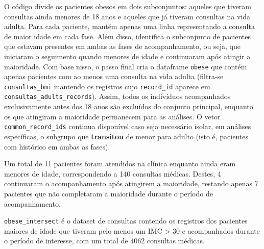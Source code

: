 \documentclass[
]{article}
\newenvironment{Shaded}{\begin{snugshade}}{\end{snugshade}}
\newcommand{\CommentTok}[1]{\textcolor[rgb]{0.37,0.37,0.37}{#1}}
\newcommand{\FunctionTok}[1]{\textcolor[rgb]{0.28,0.35,0.67}{#1}}
\newcommand{\NormalTok}[1]{\textcolor[rgb]{0.00,0.23,0.31}{#1}}
\newcommand{\OtherTok}[1]{\textcolor[rgb]{0.00,0.23,0.31}{#1}}
\newcommand{\SpecialCharTok}[1]{\textcolor[rgb]{0.37,0.37,0.37}{#1}}
\begin{document}
\begin{Shaded}
\end{Shaded}

O código divide os pacientes obesos em dois subconjuntos: aqueles que
tiveram consultas ainda menores de 18 anos e aqueles que já tiveram
consultas na vida adulta. Para cada paciente, mantém apenas uma linha
representando a consulta de maior idade em cada fase. Além disso,
identifica o subconjunto de pacientes que estavam presentes em ambas as
fases de acompanhamento, ou seja, que iniciaram o seguimento quando
menores de idade e continuaram após atingir a maioridade. Com base
nisso, o passo final cria o dataframe \texttt{obese} que contém apenas
pacientes com ao menos uma consulta na vida adulta (filtra-se
\texttt{consultas\_bmi} mantendo os registros cujo \texttt{record\_id}
aparece em \texttt{consultas\_adults\_records}). Assim, todos os
indivíduos acompanhados exclusivamente antes dos 18 anos são excluídos
do conjunto principal, enquanto os que atingiram a maioridade permanecem
para as análises. O vetor \texttt{common\_record\_ids} continua
disponível caso seja necessário isolar, em análises específicas, o
subgrupo que \textbf{transitou} de menor para adulto (isto é, pacientes
com histórico em ambas as fases).

Um total de 11 pacientes foram atendidos na clínica enquanto ainda eram
menores de idade, correspondendo a 140 consultas médicas. Destes, 4
continuaram o acompanhamento após atingirem a maioridade, restando
apenas 7 pacientes que não completaram a maioridade durante o período de
acompanhamento.

\texttt{obese\_intersect} é o dataset de consultas contendo os registros
dos pacientes maiores de idade que tiveram pelo menos um IMC
\textgreater{} 30 e acompanhados durante o período de interesse, com um
total de 4062 consultas médicas.
\end{document}
